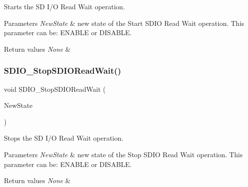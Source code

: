 Starts the SD I/O Read Wait operation. 


\begin{DoxyParams}{Parameters}
{\em New\+State} & new state of the Start S\+D\+IO Read Wait operation. This parameter can be\+: E\+N\+A\+B\+LE or D\+I\+S\+A\+B\+LE. \\
\hline
\end{DoxyParams}

\begin{DoxyRetVals}{Return values}
{\em None} & \\
\hline
\end{DoxyRetVals}
\mbox{\label{group___s_d_i_o___private___functions_gaca6b25eb2debb73ac827c66f0ebcf837}} 
\subsubsection{\texorpdfstring{SDIO\_StopSDIOReadWait()}{SDIO\_StopSDIOReadWait()}}
{\footnotesize\ttfamily void S\+D\+I\+O\+\_\+\+Stop\+S\+D\+I\+O\+Read\+Wait (\begin{DoxyParamCaption}\item[{\mbox{\hyperlink{group___exported__types_gac9a7e9a35d2513ec15c3b537aaa4fba1}{Functional\+State}}}]{New\+State }\end{DoxyParamCaption})}



Stops the SD I/O Read Wait operation. 


\begin{DoxyParams}{Parameters}
{\em New\+State} & new state of the Stop S\+D\+IO Read Wait operation. This parameter can be\+: E\+N\+A\+B\+LE or D\+I\+S\+A\+B\+LE. \\
\hline
\end{DoxyParams}

\begin{DoxyRetVals}{Return values}
{\em None} & \\
\hline
\end{DoxyRetVals}
\mbox{\label{group___s_d_i_o___private___functions_ga778d338c29df4fae9ef69432e6df32ad}} 
